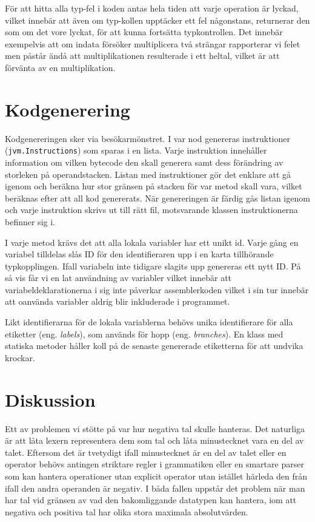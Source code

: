 \documentclass[a4paper,11pt]{article}
\newcommand{\trans}[2][eng.]{(#1 \emph{#2})}
\renewcommand{\*}[0]{\cdot}
\begin{document}
För att hitta alla typ-fel i koden antas hela tiden att varje operation är
lyckad, vilket innebär att även om typ-kollen upptäcker ett fel någonstans,
returnerar den som om det vore lyckat, för att kunna fortsätta typkontrollen.
Det innebär exempelvis att om indata försöker multiplicera två strängar
rapporterar vi felet men påstår ändå att multiplikationen resulterade i ett
heltal, vilket är att förvänta av en multiplikation.

\section*{Kodgenerering}

Kodgenereringen sker via besökarmönstret. I var nod genereras instruktioner
(\texttt{jvm.Instructions}) som sparas i en lista. Varje instruktion innehåller
information om vilken bytecode den skall generera samt dess förändring av
storleken på operandstacken. Listan med instruktioner gör det enklare att gå
igenom och beräkna hur stor gränsen på stacken för var metod skall vara, vilket
beräknas efter att all kod genererats. När genereringen är färdig gås listan
igenom och varje instruktion skrivs ut till rätt fil, motsvarande klassen
instruktionerna befinner sig i.

I varje metod krävs det att alla lokala variabler har ett unikt id. Varje gång
en variabel tilldelas slås ID för den identifieraren upp i en karta tillhörande
typkopplingen. Ifall variabeln inte tidigare slagits upp genereras ett nytt ID.
På så vis får vi en lat användning av variabler vilket innebär att
variabeldeklarationerna i sig inte påverkar assemblerkoden vilket i sin tur
innebär att oanvända variabler aldrig blir inkluderade i programmet.

Likt identifierarna för de lokala variablerna behövs unika identifierare för
alla etiketter \trans{labels}, som används för hopp \trans{branches}. En klass
med statiska metoder håller koll på de senaste genererade etiketterna för att
undvika krockar.



\section*{Diskussion}

Ett av problemen vi stötte på var hur negativa tal skulle hanteras. Det
naturliga är att låta lexern representera dem som tal och låta minustecknet
vara en del av talet. Eftersom det är tvetydigt ifall minustecknet är en del av
talet eller en operator behövs antingen striktare regler i grammatiken eller en
smartare parser som kan hantera operationer utan explicit operator utan
istället härleda den från ifall den andra operanden är negativ. I båda fallen
uppstår det problem när man har tal vid gränsen av vad den bakomliggande
datatypen kan hantera, iom att negativa och positiva tal har olika stora
maximala absolutvärden.
\end{document}
